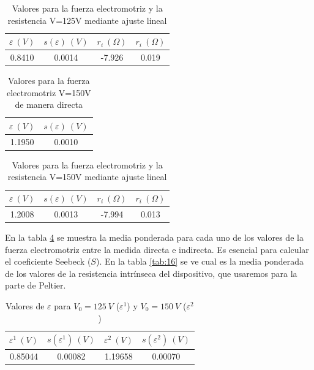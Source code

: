 \documentclass[12pt,a4paper]{article}
\begin{document}
\begin{table}[h!] 	 \centering 
\begin{tabular}{|c|c|c|c|} 
\hline 
$\varepsilon \ (V)$ & $s(\varepsilon) \ (V)$ & $r_i \ (\Omega)$ & $r_i \ (\Omega)$  \\ \hline
0.8410  & 0.0014 &  -7.926 & 0.019 \\ 
\hline
\end{tabular} 
\caption{Valores para la fuerza electromotriz y la resistencia V=125V mediante ajuste lineal} 
\label{tab:12}
\end{table}



\begin{table}[h!] 	 \centering 
\begin{tabular}{|c|c|} 
\hline 
$\varepsilon \ (V)$ & $s(\varepsilon) \ (V) $ \\ \hline 
1.1950  & 0.0010 \\ 
\hline
\end{tabular} 
\caption{Valores para la fuerza electromotriz  V=150V de manera directa} 
\label{tab:13} 
\end{table} 

\begin{table}[h!] 	 \centering 
\begin{tabular}{|c|c|c|c|} 
\hline 
$\varepsilon \ (V)$ & $s(\varepsilon) \ (V)$ & $r_i \ (\Omega)$ & $r_i \ (\Omega)$  \\ \hline
1.2008  & 0.0013 &  -7.994 & 0.013 \\ 
\hline
\end{tabular} 
\caption{Valores para la fuerza electromotriz y la resistencia V=150V mediante ajuste lineal} 
\label{tab:14} 
\end{table}


En la tabla \ref{tab:15} se muestra la media ponderada para cada uno de los valores de la fuerza electromotriz entre la medida directa e indirecta. Es esencial para calcular el coeficiente Seebeck ($S$). En la tabla \ref{tab:16} se ve cual es la media ponderada de los valores de la resistencia intrínseca del dispositivo, que usaremos para la parte de Peltier.

\begin{table}[h!] 	 \centering 
\begin{tabular}{|c|c|c|c|} 
\hline 
$\varepsilon^1  \ (V)$ & $s(\varepsilon^1) \ (V)$  & $\varepsilon^2  \ (V)$ & $s(\varepsilon^2) \ (V) $ \\ \hline  
 0.85044 &  0.00082 &  1.19658 & 0.00070 \\ \hline 
\end{tabular} 
\caption{Valores de $\varepsilon$ para $V_0 = 125 \ V$ ($\varepsilon^1$) y $V_0 = 150 \ V$ ($\varepsilon^2$)} 
\label{tab:15} 
\end{table} 
\end{document}
